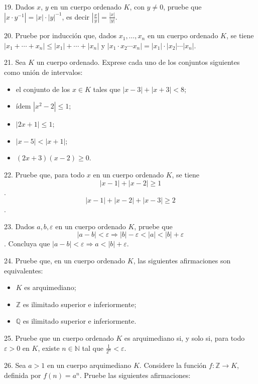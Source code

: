 \documentclass[12pt,oneside]{book}
\begin{document}
19. Dados \(x\), \(y\) en un cuerpo ordenado \(K\), con \(y \neq 0\), pruebe que \(|x \cdot y^{-1}| = |x| \cdot |y|^{-1}\), es decir \(\left|\frac{x}{y}\right| = \frac{|x|}{|y|}\).

20. Pruebe por inducción que, dados \(x_1, \ldots, x_n\) en un cuerpo ordenado \(K\), se tiene \(|x_1 + \cdots + x_n| \leq |x_1| + \cdots + |x_n|\) y \(|x_1 \cdot x_2 \cdots x_n| = |x_1| \cdot |x_2| \cdots |x_n|\).

21. Sea \(K\) un cuerpo ordenado. Exprese cada uno de los conjuntos siguientes como unión de intervalos:

\begin{itemize}
    \item [a)] el conjunto de los \(x \in K\) tales que \(|x - 3| + |x + 3| < 8\);
    \item [b)] ídem \(|x^2 - 2| \leq 1\);
    \item [c)] \( |2x + 1| \leq 1 \);
    \item [d)] \( |x - 5| < |x + 1| \);
    \item [e)] \( (2x + 3)(x - 2) \geq 0 \).
\end{itemize}

22. Pruebe que, para todo \( x \) en un cuerpo ordenado \( K \), se tiene
\[ |x - 1| + |x - 2| \geq 1 \].
\[ |x - 1| + |x - 2| + |x - 3| \geq 2 \].

23. Dados \( a, b, \varepsilon \) en un cuerpo ordenado \( K \), pruebe que
\[ |a - b| < \varepsilon \Rightarrow |b| - \varepsilon < |a| < |b| + \varepsilon \].
Concluya que \( |a - b| < \varepsilon \Rightarrow a < |b| + \varepsilon \).

24. Pruebe que, en un cuerpo ordenado \( K \), las siguientes afirmaciones son equivalentes:

\begin{itemize}
    \item [(i)] \( K \) es arquimediano;
    \item [(ii)] \( \mathbb{Z} \) es ilimitado superior e inferiormente;
    \item [(iii)] \( \mathbb{Q} \) es ilimitado superior e inferiormente.
\end{itemize}

25. Pruebe que un cuerpo ordenado \( K \) es arquimediano si, y solo si, para todo \( \varepsilon > 0 \) en \( K \), existe \( n \in \mathbb{N} \) tal que \( \frac{1}{2^n} < \varepsilon \).

26. Sea \( a > 1 \) en un cuerpo arquimediano \( K \). Considere la función \( f: \mathbb{Z} \to K \), definida por \( f(n) = a^n \). Pruebe las siguientes afirmaciones:
\end{document}

